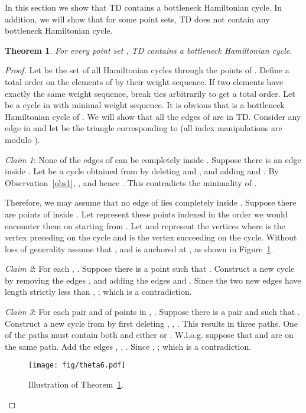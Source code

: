 \documentclass[11pt,a4paper]{article}
\newcommand{\kTD}[2]{\text{-}TD#2}
\newtheorem{theorem}{Theorem}
\begin{document}
In this section we show that \kTD{7}{} contains a bottleneck Hamiltonian cycle. In addition, we will show that for some point sets, \kTD{5}{} does not contain any bottleneck Hamiltonian cycle.


\begin{theorem}
\label{hamiltonicity-thr}
 For every point set , \kTD{7}{} contains a bottleneck Hamiltonian cycle.
\end{theorem}

\begin{proof}
Let  be the set of all Hamiltonian cycles through the points of . Define a total
order on the elements of  by their weight sequence. If two elements have exactly the same weight sequence, break ties arbitrarily to get a total order. 
Let  be a cycle in  with minimal weight sequence. It is obvious that  is a bottleneck Hamiltonian cycle of . We will show that all the edges of  are in \kTD{7}{}. Consider any edge  in  and let  be the triangle corresponding to  (all index manipulations are modulo ).

{\em Claim 1}: None of the edges of  can be completely inside . Suppose there is an edge  inside . Let  be a cycle obtained from  by deleting  and , and adding  and . By Observation~\ref{obs1}, , and hence . This contradicts the minimality of .

Therefore, we may assume that no edge of  lies completely inside . Suppose there are  points of  inside . Let  represent these points indexed in the order we would encounter them on  starting from . Let  and  represent the vertices where  is the vertex preceding  on the cycle and  is the vertex succeeding  on the cycle.
Without loss of generality assume that , and  is anchored at , as shown in Figure~\ref{hamiltonicity-fig1}. 

{\em Claim 2}: For each , . Suppose there is a point  such that . Construct a new cycle  by removing the edges ,  and adding the edges  and . Since the two new edges have length strictly less than , ; which is a contradiction.

{\em Claim 3}: For each pair  and  of points in , . Suppose there is a pair  and  such that .  Construct a new cycle  from  by first deleting , ,  . This results in three paths. One of the paths must contain both  and either  or . W.l.o.g. suppose that  and  are on the same path. Add the edges , , . Since , ; which is a contradiction.

\begin{figure}[htb]
  \centering
  \texttt{[image: fig/theta6.pdf]}
 \caption{Illustration of Theorem~\ref{hamiltonicity-thr}.}
  \label{hamiltonicity-fig1}
\end{figure}


\end{proof}
\end{document}
